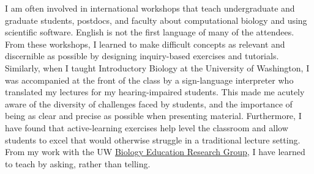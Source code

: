 I am often involved in international workshops that teach undergraduate and
graduate students, postdocs, and faculty about computational biology and using
scientific software.
English is not the first language of many of the attendees.
From these workshops, I learned to make difficult concepts as relevant and
discernible as possible by designing
inquiry-based exercises and tutorials.
Similarly, when I taught Introductory Biology at the University of
Washington, I was accompanied at the front of the class by a sign-language
interpreter who translated my lectures for my hearing-impaired students.
This made me acutely aware of the diversity of challenges faced by
students, and the importance of being as clear and precise as possible when
presenting material.
Furthermore, I have found that active-learning exercises help level the
classroom and allow students to excel that would otherwise struggle in a
traditional lecture setting.
From my work with the UW
\href{https://sites.google.com/site/uwbioedresgroup/home}{Biology Education
    Research Group}, I have learned to teach by asking, rather than telling.



